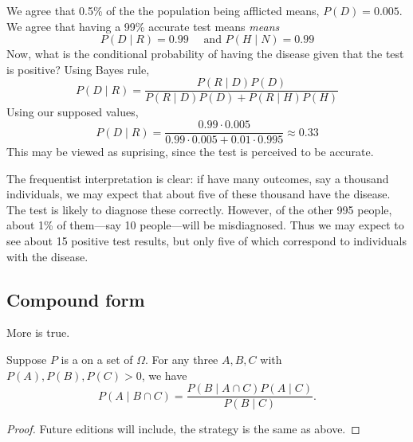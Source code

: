 We agree that 0.5\% of the the population being afflicted means, $P(D) = 0.005$.
We agree that having a 99\% accurate test means \textit{means}
\[
P(D \mid  R) = 0.99 \quad \text{ and } P(H \mid  N) = 0.99
\]
Now, what is the conditional probability of having the disease given that the test is positive?
Using Bayes rule,
\[
P(D \mid  R) = \frac{P(R \mid  D)P(D)}{P(R\mid D)P(D) + P(R\mid H)P(H)}
\]
Using our supposed values,
\[
P(D \mid  R) = \frac{0.99 \cdot  0.005}{0.99 \cdot  0.005 + 0.01 \cdot  0.995} \approx 0.33
\]
This may be viewed as suprising, since the test is perceived to be accurate.

The frequentist interpretation is clear: if have many outcomes, say a thousand individuals, we may expect that about five of these thousand have the disease.
The test is likely to diagnose these correctly.
However, of the other 995 people, about 1\% of them---say 10 people---will be misdiagnosed.
Thus we may expect to see about 15 positive test results, but only five of which correspond to individuals with the disease.

\subsection*{Compound form}

More is true.

\begin{proposition}
Suppose $P$ is a on a set of $\Omega $.
For any three $A, B, C$ with $P(A), P(B), P(C) > 0$, we have
\[
P(A \mid  B \cap  C) = \frac{ P(B \mid  A \cap  C)P(A \mid C) }{ P(B \mid  C) }.
\]
\begin{proof}Future editions will include, the strategy is the same as above.\end{proof}
\end{proposition}

\blankpage